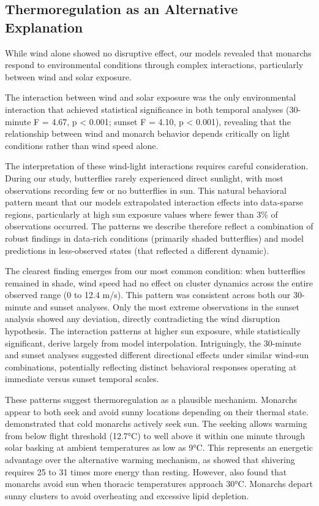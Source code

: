 \subsection{Thermoregulation as an Alternative Explanation}

While wind alone showed no disruptive effect, our models revealed that monarchs respond to environmental conditions through complex interactions, particularly between wind and solar exposure.

The interaction between wind and solar exposure was the only environmental interaction that achieved statistical significance in both temporal analyses (30-minute F = 4.67, p < 0.001; sunset F = 4.10, p < 0.001), revealing that the relationship between wind and monarch behavior depends critically on light conditions rather than wind speed alone.

The interpretation of these wind-light interactions requires careful consideration. During our study, butterflies rarely experienced direct sunlight, with most observations recording few or no butterflies in sun. This natural behavioral pattern meant that our models extrapolated interaction effects into data-sparse regions, particularly at high sun exposure values where fewer than 3\% of observations occurred. The patterns we describe therefore reflect a combination of robust findings in data-rich conditions (primarily shaded butterflies) and model predictions in less-observed states (that reflected a different dynamic).

The clearest finding emerges from our most common condition: when butterflies remained in shade, wind speed had no effect on cluster dynamics across the entire observed range (0 to 12.4 m/s). This pattern was consistent across both our 30-minute and sunset analyses. Only the most extreme observations in the sunset analysis showed any deviation, directly contradicting the wind disruption hypothesis. The interaction patterns at higher sun exposure, while statistically significant, derive largely from model interpolation. Intriguingly, the 30-minute and sunset analyses suggested different directional effects under similar wind-sun combinations, potentially reflecting distinct behavioral responses operating at immediate versus sunset temporal scales.

These patterns suggest thermoregulation as a plausible mechanism. Monarchs appear to both seek and avoid sunny locations depending on their thermal state. \textcite{mastersMonarchButterflyDanaus1988} demonstrated that cold monarchs actively seek sun. The seeking allows warming from below flight threshold (12.7°C) to well above it within one minute through solar basking at ambient temperatures as low as 9°C. This represents an energetic advantage over the alternative warming mechanism, as \textcite{kammerThoracicTemperatureShivering1970} showed that shivering requires 25 to 31 times more energy than resting. However, \textcite{mastersMonarchButterflyDanaus1988} also found that monarchs avoid sun when thoracic temperatures approach 30°C. Monarchs depart sunny clusters to avoid overheating and excessive lipid depletion.

